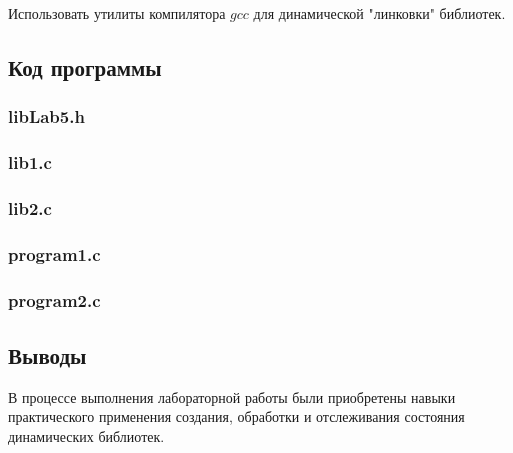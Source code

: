 \documentclass[12pt]{article}
\begin{document}
	Использовать утилиты компилятора $gcc$ для динамической "линковки" библиотек.
	
	\subsection*{Код программы}
	
	\subsubsection*{libLab5.h}
	
	
	
	\subsubsection*{lib1.c}
	
	
	
	\subsubsection*{lib2.c}
	
	
	
	\subsubsection*{program1.c}
	
	
	
	\subsubsection*{program2.c}
	
	
	
	\subsection*{Выводы}
	
	В процессе выполнения лабораторной работы были приобретены навыки практического применения создания, обработки и отслеживания состояния динамических библиотек.
	
\end{document}
